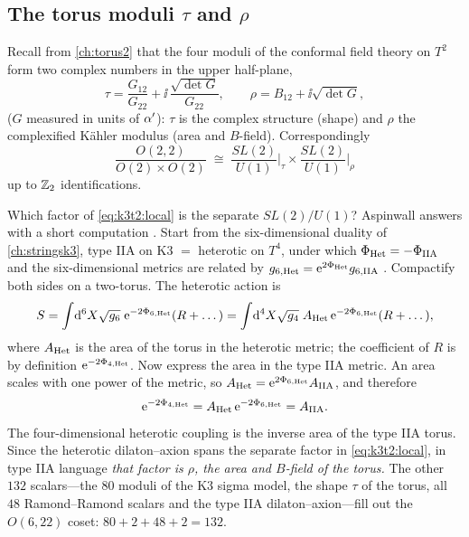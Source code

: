 \subsection{The torus moduli \texorpdfstring{$\tau$}{tau} and \texorpdfstring{$\rho$}{rho}}
Recall from \cref{ch:torus2} that the four moduli of the conformal field theory on $T^2$
form two complex numbers in the upper half-plane,
\begin{equation}\label{eq:k3t2:taurho}
 \tau=\frac{G_{12}}{G_{22}}+\ii\,\frac{\sqrt{\det G}}{G_{22}},\qquad
 \rho=B_{12}+\ii\sqrt{\det G},
\end{equation}
($G$ measured in units of $\alpha'$): $\tau$ is the complex structure (shape) and $\rho$ the
complexified K\"ahler modulus (area and $B$-field). Correspondingly
\begin{equation}\label{eq:k3t2:o22}
 \frac{O(2,2)}{O(2)\times O(2)}\;\cong\;\frac{SL(2)}{U(1)}\bigg|_\tau\times
 \frac{SL(2)}{U(1)}\bigg|_\rho
\end{equation}
up to $\mathbb{Z}_2$ identifications.

Which factor of \eqref{eq:k3t2:local} is the separate $SL(2)/U(1)$? Aspinwall answers with a
short computation . Start from the
six-dimensional duality of \cref{ch:stringsk3}, type IIA on K3 $=$ heterotic on $T^4$, under
which $\Phi_{\rm Het}=-\Phi_{\rm IIA}$ and the six-dimensional metrics are related by
$g_{6,\rm Het}=\mathrm{e}^{2\Phi_{\rm Het}}g_{6,\rm IIA}$ .
Compactify both sides on a two-torus. The heterotic action is
\begin{equation}\label{eq:k3t2:action}
 S=\int\!\mathrm{d}^6X\sqrt{g_6}\;\mathrm{e}^{-2\Phi_{6,\rm Het}}(R+\dots)
 =\int\!\mathrm{d}^4X\sqrt{g_4}\;A_{\rm Het}\,\mathrm{e}^{-2\Phi_{6,\rm Het}}(R+\dots),
\end{equation}
where $A_{\rm Het}$ is the area of the torus in the heterotic metric; the coefficient of $R$
is by definition $\mathrm{e}^{-2\Phi_{4,\rm Het}}$. Now express the area in the type IIA metric. An
area scales with one power of the metric, so
$A_{\rm Het}=\mathrm{e}^{2\Phi_{6,\rm Het}}A_{\rm IIA}$, and therefore
\begin{equation}\label{eq:k3t2:area}
 \mathrm{e}^{-2\Phi_{4,\rm Het}}=A_{\rm Het}\,\mathrm{e}^{-2\Phi_{6,\rm Het}}=A_{\rm IIA}.
\end{equation}
The four-dimensional heterotic coupling is the inverse area of the type IIA torus. Since the
heterotic dilaton--axion spans the separate factor in \eqref{eq:k3t2:local}, in type IIA
language \emph{that factor is $\rho$, the area and $B$-field of the torus.} The other $132$
scalars---the $80$ moduli of the K3 sigma model, the shape $\tau$ of the torus, all $48$
Ramond--Ramond scalars and the type IIA dilaton--axion---fill out the $O(6,22)$ coset:
$80+2+48+2=132$.

